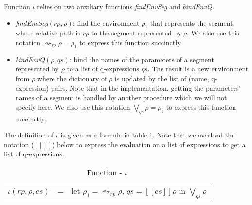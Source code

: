 Function $\iota$ relies on two auxiliary functions \emph{findEnvSeg} and \emph{bindEnvQ}.
\begin{itemize}
  \item \emph{findEnvSeg}$(rp, \rho)$: find the environment $\rho_1$ that represents the segment whose relative path is $rp$ to the segment represented by $\rho$. We also use this notation $\rightsquigarrow_{rp}\rho = \rho_1$ to express this function succinctly.
  \item \emph{bindEnvQ}$(\rho, qs)$: bind the names of the parameters of a segment represented by $\rho$ to a list of q-expressions $qs$. The result is a new environment from $\rho$ where the dictionary of $\rho$ is updated by the list of (name, q-expression) pairs. Note that in the implementation, getting the parameters' names of a segment is handled by another procedure which we will not specify here. We also use this notation $\bigvee_{qs}\rho = \rho_1$ to express this function succinctly.
\end{itemize}
The definition of $\iota$ is given as a formula in table \ref{extension:tab:segEnv}. Note that we overload the notation ($[\![]\!]$) below to express the evaluation on a list of expressions to get a list of q-expressions.
\begin{table}[h]
  \centering
  \begin{tabular}{l l l}
    $\iota(rp, \rho, es)$ & = & let $\rho_1 = \rightsquigarrow_{rp}\rho$, $qs = [\![es]\!]\rho$ in $\bigvee_{qs}\rho$
  \end{tabular}
  \caption{Function - $\iota$}
  \label{extension:tab:segEnv}
\end{table}

